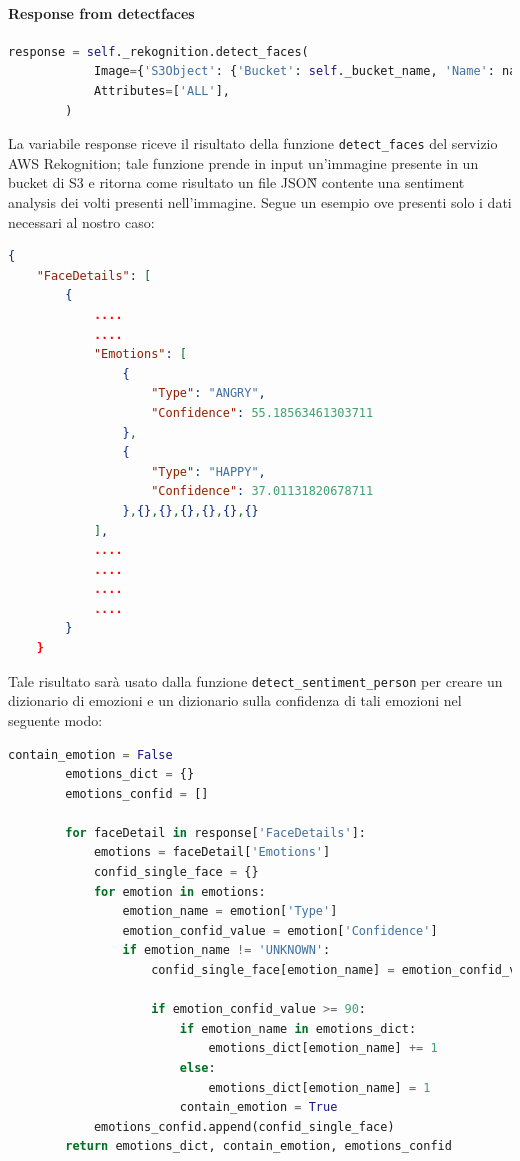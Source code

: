 \paragraph{Response from detect\textunderscore{}faces} \aCapo{}
	\begin{lstlisting}[language=Python]
response = self._rekognition.detect_faces(
            Image={'S3Object': {'Bucket': self._bucket_name, 'Name': name_image}},
            Attributes=['ALL'],
        )
	\end{lstlisting}
	La variabile response riceve il risultato della funzione \verb+detect_faces+ del servizio AWS Rekognition; tale funzione prende in input un'immagine presente in un bucket di S3 e ritorna come risultato un file JSON\G{} contente  una sentiment analysis dei volti presenti nell'immagine. Segue un esempio ove presenti solo i dati necessari al nostro caso:
	\begin{lstlisting}[language=JSON]
    {
    "FaceDetails": [
        {
        	....
        	....
            "Emotions": [
                {
                    "Type": "ANGRY",
                    "Confidence": 55.18563461303711
                },
                {
                    "Type": "HAPPY",
                    "Confidence": 37.01131820678711
                },{},{},{},{},{},{}
            ],
            ....
            ....
            ....
            ....
        }
    }
	\end{lstlisting}
	Tale risultato sarà usato dalla funzione \verb+detect_sentiment_person+ per creare  un dizionario di emozioni e
un dizionario sulla confidenza di tali emozioni nel seguente modo:
	\begin{lstlisting}[language=Python]
		contain_emotion = False
        emotions_dict = {}
        emotions_confid = []

        for faceDetail in response['FaceDetails']:
            emotions = faceDetail['Emotions']
            confid_single_face = {}
            for emotion in emotions:
                emotion_name = emotion['Type']
                emotion_confid_value = emotion['Confidence']
                if emotion_name != 'UNKNOWN':
                    confid_single_face[emotion_name] = emotion_confid_value

                    if emotion_confid_value >= 90:
                        if emotion_name in emotions_dict:
                            emotions_dict[emotion_name] += 1
                        else:
                            emotions_dict[emotion_name] = 1
                        contain_emotion = True
            emotions_confid.append(confid_single_face)
        return emotions_dict, contain_emotion, emotions_confid
	\end{lstlisting}
